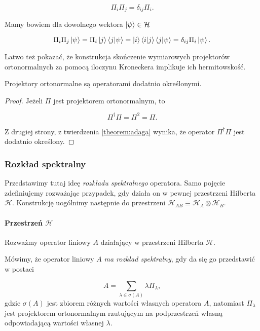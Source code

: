 $$
    \Pi_{i} \Pi_{j} = \delta_{ij} \Pi_{i}.
$$

Mamy bowiem dla dowolnego wektora $\ket{\psi} \in \mathcal{H}$

$$
    \Pi_{i} \Pi_{j} \ket{\psi} = \Pi_{i} \ket{j} \bra{j}\ket{\psi} = \ket{i} \bra{i}\ket{j} \bra{j}\ket{\psi} = \delta_{ij} \Pi_{i} \ket{\psi}.
$$

Latwo też pokazać, że konstrukcja skończenie wymiarowych projektorów ortonormalnych za pomocą iloczynu Kroneckera implikuje ich hermitowskość.

\begin{fact}
    Projektory ortonormalne są operatorami dodatnio określonymi.
\end{fact}

\begin{proof}
    Jeżeli $\Pi$ jest projektorem ortonormalnym, to

    $$
        \Pi ^ {\dag} \Pi = \Pi ^ 2 =\Pi.
    $$

    Z drugiej strony, z twierdzenia \ref{theorem:adaga} wynika, że operator $\Pi ^ {\dag} \Pi$ jest dodatnio określony.
\end{proof}

\subsubsection{Rozkład spektralny}

Przedstawimy tutaj ideę \textit{rozkładu spektralnego} operatora. Samo pojęcie zdefiniujemy rozważając przypadek, gdy działa on w pewnej przestrzeni Hilberta $\mathcal{H}$. Konstrukcję uogólnimy następnie do przestrzeni $\mathcal{H}_{AB} \equiv \mathcal{H}_A \otimes \mathcal{H}_B$.

\paragraph{Przestrzeń $\mathcal{H}$}

Rozważmy operator liniowy $A$ działający w przestrzeni Hilberta $\mathcal{H}$.

\begin{definition}
    Mówimy, że operator liniowy $A$ \textit{ma rozkład spektralny}, gdy da się go przedstawić w postaci

    $$
        A = \sum\limits_{\lambda \in \sigma(A)} \lambda \Pi_{\lambda},
    $$
    gdzie $\sigma(A)$ jest zbiorem różnych wartości własnych operatora $A$, natomiast $\Pi_{\lambda}$ jest projektorem ortonormalnym rzutującym na podprzestrzeń własną odpowiadającą wartości własnej $\lambda$.
\end{definition}


